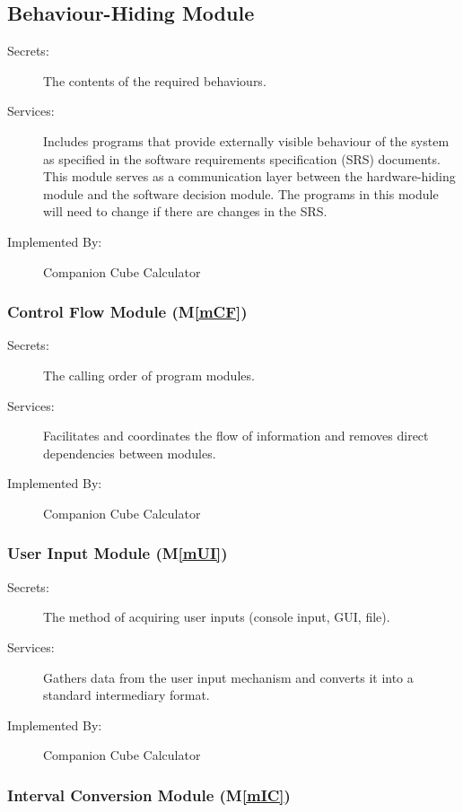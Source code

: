 \documentclass[12pt, titlepage]{article}
\newcommand{\mref}[1]{M\ref{#1}}
\newcommand{\progname}{Companion Cube Calculator} %
\begin{document}
\subsection{Behaviour-Hiding Module}

\begin{description}
\item[Secrets:]The contents of the required behaviours.
\item[Services:]Includes programs that provide externally visible behaviour of
  the system as specified in the software requirements specification (SRS)
  documents. This module serves as a communication layer between the
  hardware-hiding module and the software decision module. The programs in this
  module will need to change if there are changes in the SRS.
\item[Implemented By:] \progname{}
\end{description}

\subsubsection{Control Flow Module (\mref{mCF})}

\begin{description}
	\item[Secrets:] The calling order of program modules.
	\item[Services:] Facilitates and coordinates the flow of information 
	and removes direct dependencies between modules.
	\item[Implemented By:] \progname{}
\end{description}

\subsubsection{User Input Module (\mref{mUI})}

\begin{description}
\item[Secrets:] The method of acquiring user inputs (console input, GUI, file).
\item[Services:] Gathers data from the user input mechanism and converts it 
into a standard intermediary format.
\item[Implemented By:] \progname{}
\end{description}

\subsubsection{Interval Conversion Module (\mref{mIC})}
\end{document}
